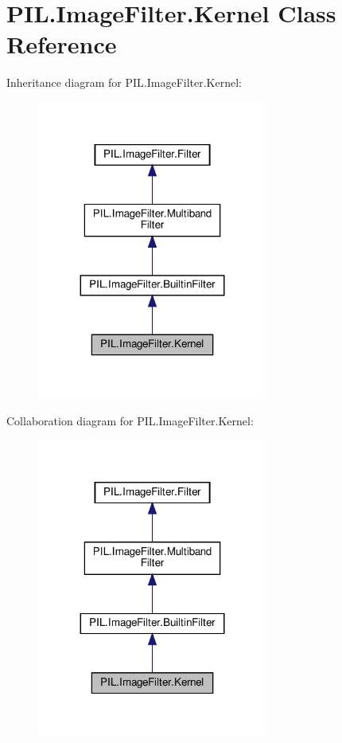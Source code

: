 \hypertarget{classPIL_1_1ImageFilter_1_1Kernel}{}\section{P\+I\+L.\+Image\+Filter.\+Kernel Class Reference}
\label{classPIL_1_1ImageFilter_1_1Kernel}


Inheritance diagram for P\+I\+L.\+Image\+Filter.\+Kernel\+:
\nopagebreak
\begin{figure}[H]
\begin{center}
\leavevmode
\includegraphics[width=215pt]{classPIL_1_1ImageFilter_1_1Kernel__inherit__graph}
\end{center}
\end{figure}


Collaboration diagram for P\+I\+L.\+Image\+Filter.\+Kernel\+:
\nopagebreak
\begin{figure}[H]
\begin{center}
\leavevmode
\includegraphics[width=215pt]{classPIL_1_1ImageFilter_1_1Kernel__coll__graph}
\end{center}
\end{figure}
